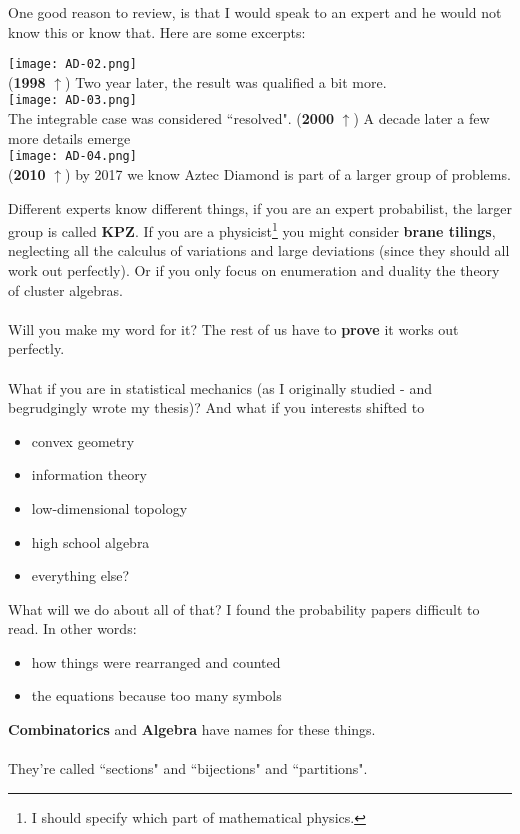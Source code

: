 \documentclass[12pt]{article}
\begin{document}
\newpage

\noindent One good reason to review, is that I would speak to an expert and he would not know this or know that.  Here are some excerpts:

\texttt{[image: AD-02.png]} \\
(\textbf{1998} $\uparrow$) Two year later, the result was qualified a bit more.\\
\texttt{[image: AD-03.png]} \\
The integrable case was considered ``resolved".  (\textbf{2000} $\uparrow$)  A decade later a few more details emerge \\
\texttt{[image: AD-04.png]} \\
(\textbf{2010} $\uparrow$) by 2017 we know Aztec Diamond is part of a larger group of problems.

\newpage

\noindent Different experts know different things, if you are an expert probabilist, the larger group is called \textbf{KPZ}.  If you are a physicist\footnote{I should specify which part of mathematical physics.} you might consider \textbf{brane tilings}, neglecting all the calculus of variations and large deviations (since they should all work out perfectly). Or if you only focus on enumeration and duality the theory of cluster algebras. \\ \\
Will you make my word for it? The rest of us have to \textbf{prove} it works out perfectly. \\ \\ 
What if you are in statistical mechanics (as I originally studied - and begrudgingly wrote my thesis)?  And what if you interests shifted to
\begin{itemize}
\item convex geometry 
\item information theory
\item low-dimensional topology
\item high school algebra 
\item everything else?
\end{itemize}
What will we do about all of that?  I found the probability papers difficult to read.  In other words:
\begin{itemize}
\item how things were rearranged and counted
\item the equations because too many symbols
\end{itemize}
\textbf{Combinatorics} and \textbf{Algebra} have names for these things. \\ \\ They're called ``sections" and ``bijections" and ``partitions".
\end{document}

